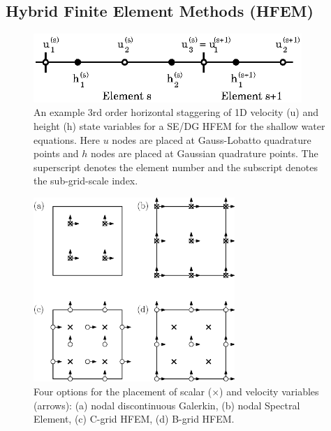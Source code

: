 \documentclass[11pt]{article}
\begin{document}
\subsection{Hybrid Finite Element Methods (HFEM)} \label{sec:HFEM}

\begin{figure}
\begin{center}
\includegraphics[width=4in]{SEStaggered}
\end{center}
\caption{An example 3rd order horizontal staggering of 1D velocity (u) and height (h) state variables for a SE/DG HFEM for the shallow water equations.  Here $u$ nodes are placed at Gauss-Lobatto quadrature points and $h$ nodes are placed at Gaussian quadrature points.  The superscript denotes the element number and the subscript denotes the sub-grid-scale index.} \label{fig:SEStaggered}
\end{figure}

\begin{figure}
\begin{center}
\includegraphics[width=3in]{NodalArrangement}
\end{center}
\caption{Four options for the placement of scalar ($\times$) and velocity variables (arrows): (a) nodal discontinuous Galerkin, (b) nodal Spectral Element, (c) C-grid HFEM, (d) B-grid HFEM.} \label{fig:NodalArrangement}
\end{figure}
\end{document}

